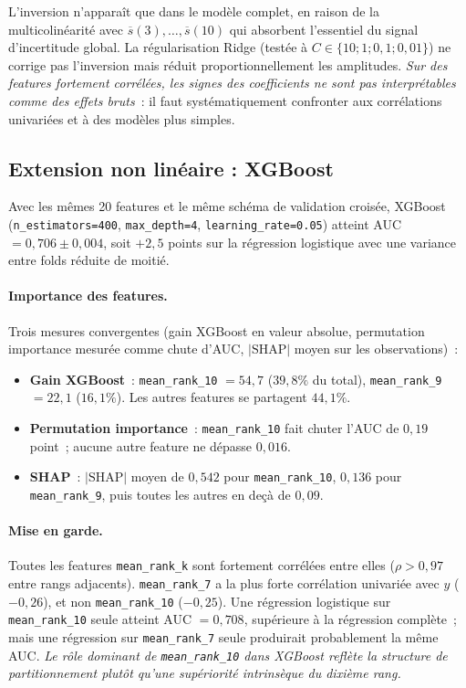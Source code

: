 \documentclass[12pt,a4paper]{article}
\begin{document}
L'inversion n'apparaît que dans le modèle complet, en raison de la multicolinéarité avec $\overline{s}(3),\ldots,\overline{s}(10)$ qui absorbent l'essentiel du signal d'incertitude global. La régularisation Ridge (testée à $C \in \{10; 1; 0{,}1; 0{,}01\}$) ne corrige pas l'inversion mais réduit proportionnellement les amplitudes. \emph{Sur des features fortement corrélées, les signes des coefficients ne sont pas interprétables comme des effets bruts}~: il faut systématiquement confronter aux corrélations univariées et à des modèles plus simples.

\subsection{Extension non linéaire : XGBoost}
\label{ann:xgb}

Avec les mêmes 20 features et le même schéma de validation croisée, XGBoost (\texttt{n\_estimators=400}, \texttt{max\_depth=4}, \texttt{learning\_rate=0.05}) atteint AUC $= 0{,}706 \pm 0{,}004$, soit $+2{,}5$ points sur la régression logistique avec une variance entre folds réduite de moitié.

\paragraph{Importance des features.} Trois mesures convergentes (gain XGBoost en valeur absolue, permutation importance mesurée comme chute d'AUC, $|\text{SHAP}|$ moyen sur les observations)~:
\begin{itemize}[itemsep=0pt,topsep=2pt]
    \item \textbf{Gain XGBoost}~: \texttt{mean\_rank\_10} $= 54{,}7$ ($39{,}8\%$ du total), \texttt{mean\_rank\_9} $= 22{,}1$ ($16{,}1\%$). Les autres features se partagent $44{,}1\%$.
    \item \textbf{Permutation importance}~: \texttt{mean\_rank\_10} fait chuter l'AUC de $0{,}19$ point~; aucune autre feature ne dépasse $0{,}016$.
    \item \textbf{SHAP}~: $|\text{SHAP}|$ moyen de $0{,}542$ pour \texttt{mean\_rank\_10}, $0{,}136$ pour \texttt{mean\_rank\_9}, puis toutes les autres en deçà de $0{,}09$.
\end{itemize}

\paragraph{Mise en garde.} Toutes les features \texttt{mean\_rank\_k} sont fortement corrélées entre elles ($\rho > 0{,}97$ entre rangs adjacents). \texttt{mean\_rank\_7} a la plus forte corrélation univariée avec $y$ ($-0{,}26$), et non \texttt{mean\_rank\_10} ($-0{,}25$). Une régression logistique sur \texttt{mean\_rank\_10} seule atteint AUC $= 0{,}708$, supérieure à la régression complète~; mais une régression sur \texttt{mean\_rank\_7} seule produirait probablement la même AUC. \emph{Le rôle dominant de \texttt{mean\_rank\_10} dans XGBoost reflète la structure de partitionnement plutôt qu'une supériorité intrinsèque du dixième rang.}
\end{document}
